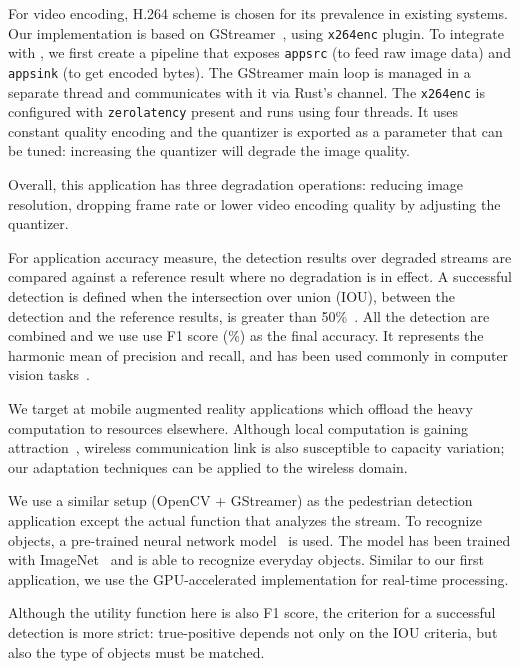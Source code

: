 For video encoding, H.264 scheme is chosen for its prevalence in existing
systems. Our implementation is based on GStreamer~\cite{gstreamer}, using
\texttt{x264enc} plugin. To integrate with \sysname{}, we first create a
pipeline that exposes \texttt{appsrc} (to feed raw image data) and
\texttt{appsink} (to get encoded bytes). The GStreamer main loop is managed in a
separate thread and \sysname{} communicates with it via Rust's channel. The
\texttt{x264enc} is configured with \texttt{zerolatency} present and runs using
four threads. It uses constant quality encoding and the quantizer is exported as
a parameter that can be tuned: increasing the quantizer will degrade the image
quality.

Overall, this application has three degradation operations: reducing image
resolution, dropping frame rate or lower video encoding quality by adjusting the
quantizer.

For application accuracy measure, the detection results over degraded streams
are compared against a reference result where no degradation is in effect. A
successful detection is defined when the intersection over union (IOU), between
the detection and the reference results, is greater than
50\%~\cite{everingham2010pascal}. All the detection are combined and we use use
F1 score (\%) as the final accuracy. It represents the harmonic mean of
precision and recall, and has been used commonly in computer vision
tasks~\cite{Rijsbergen:1979:IR:539927}.

 We target at mobile augmented reality applications
which offload the heavy computation to resources elsewhere. Although local
computation is gaining attraction~\cite{satyanarayanan2009case, zhang2015cloud},
wireless communication link is also susceptible to capacity variation; our
adaptation techniques can be applied to the wireless domain.

We use a similar setup (OpenCV + GStreamer) as the pedestrian detection
application except the actual function that analyzes the stream. To recognize
objects, a pre-trained neural network model~\cite{darknet13} is used. The model
has been trained with ImageNet~\cite{krizhevsky2012imagenet} and is able to
recognize everyday objects. Similar to our first application, we use the
GPU-accelerated implementation for real-time processing.

Although the utility function here is also F1 score, the criterion for a
successful detection is more strict: true-positive depends not only on the IOU
criteria, but also the type of objects must be matched.

